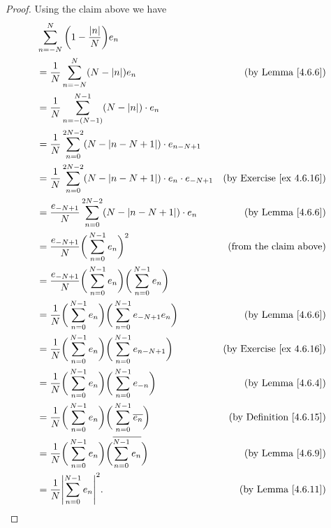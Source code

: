 \begin{proof}
    Using the claim above we have
    \begin{align*}
         & \sum_{n = -N}^N \bigg(1 - \frac{\abs{n}}{N}\bigg) e_n                                                                                     \\
         & = \frac{1}{N} \sum_{n = -N}^N (N - \abs{n}) e_n                                                    & \text{(by Lemma \ref{4.6.6})}        \\
         & = \frac{1}{N} \sum_{n = -(N - 1)}^{N - 1} (N - \abs{n}) \cdot e_n                                                                         \\
         & = \frac{1}{N} \sum_{n = 0}^{2N - 2} (N - \abs{n - N + 1}) \cdot e_{n - N + 1}                                                             \\
         & = \frac{1}{N} \sum_{n = 0}^{2N - 2} (N - \abs{n - N + 1}) \cdot e_n \cdot e_{-N + 1}               & \text{(by Exercise \ref{ex 4.6.16})} \\
         & = \frac{e_{-N + 1}}{N} \sum_{n = 0}^{2N - 2} (N - \abs{n - N + 1}) \cdot e_n                       & \text{(by Lemma \ref{4.6.6})}        \\
         & = \frac{e_{-N + 1}}{N} \bigg(\sum_{n = 0}^{N - 1} e_n\bigg)^2                                      & \text{(from the claim above)}        \\
         & = \frac{e_{-N + 1}}{N} \bigg(\sum_{n = 0}^{N - 1} e_n\bigg) \bigg(\sum_{n = 0}^{N - 1} e_n\bigg)                                          \\
         & = \frac{1}{N} \bigg(\sum_{n = 0}^{N - 1} e_n\bigg) \bigg(\sum_{n = 0}^{N - 1} e_{-N + 1} e_n\bigg) & \text{(by Lemma \ref{4.6.6})}        \\
         & = \frac{1}{N} \bigg(\sum_{n = 0}^{N - 1} e_n\bigg) \bigg(\sum_{n = 0}^{N - 1} e_{n - N + 1}\bigg)  & \text{(by Exercise \ref{ex 4.6.16})} \\
         & = \frac{1}{N} \bigg(\sum_{n = 0}^{N - 1} e_n\bigg) \bigg(\sum_{n = 0}^{N - 1} e_{-n}\bigg)         & \text{(by Lemma \ref{4.6.4})}        \\
         & = \frac{1}{N} \bigg(\sum_{n = 0}^{N - 1} e_n\bigg) \bigg(\sum_{n = 0}^{N - 1} \overline{e_n}\bigg) & \text{(by Definition \ref{4.6.15})}  \\
         & = \frac{1}{N} \bigg(\sum_{n = 0}^{N - 1} e_n\bigg) \bigg(\overline{\sum_{n = 0}^{N - 1} e_n}\bigg) & \text{(by Lemma \ref{4.6.9})}        \\
         & = \frac{1}{N} \abs{\sum_{n = 0}^{N - 1} e_n}^2.                                                    & \text{(by Lemma \ref{4.6.11})}
    \end{align*}
\end{proof}


